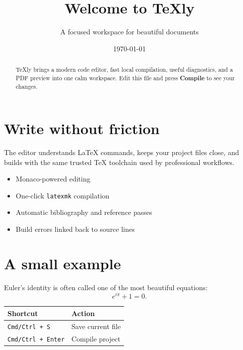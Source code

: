 \documentclass[11pt]{article}
\title{\textbf{\textcolor{texlyblue}{Welcome to TeXly}}}
\author{A focused workspace for beautiful documents}
\date{\today}
\begin{document}
\maketitle

\begin{abstract}
TeXly brings a modern code editor, fast local compilation, useful diagnostics,
and a PDF preview into one calm workspace. Edit this file and press
\textbf{Compile} to see your changes.
\end{abstract}

\section{Write without friction}

The editor understands LaTeX commands, keeps your project files close, and
builds with the same trusted TeX toolchain used by professional workflows.

\begin{itemize}
  \item Monaco-powered editing
  \item One-click \texttt{latexmk} compilation
  \item Automatic bibliography and reference passes
  \item Build errors linked back to source lines
\end{itemize}

\section{A small example}

Euler's identity is often called one of the most beautiful equations:
\[
  e^{i\pi} + 1 = 0.
\]

\begin{table}[h]
  \centering
  \begin{tabular}{@{}ll@{}}
    \toprule
    Shortcut & Action \\
    \midrule
    \texttt{Cmd/Ctrl + S} & Save current file \\
    \texttt{Cmd/Ctrl + Enter} & Compile project \\
    \bottomrule
  \end{tabular}
\end{table}
\end{document}
